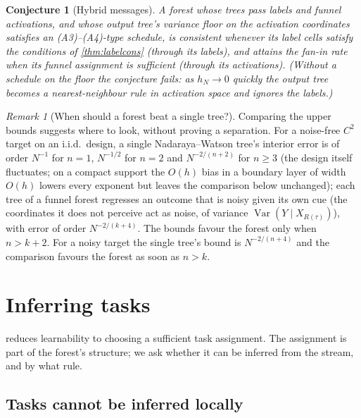 \documentclass[11pt]{article}
\newtheorem{conjecture}[theorem]{Conjecture}
\theoremstyle{definition}
\theoremstyle{remark}
\newtheorem{remark}[theorem]{Remark}
\newcommand{\Var}{\operatorname{Var}}
\begin{document}
\begin{conjecture}[Hybrid messages]\label{conj:hybrid}
A forest whose trees pass labels and funnel activations, and whose output tree's
variance floor on the activation coordinates satisfies an (A3)--(A4)-type schedule, is
consistent whenever its label cells satisfy the conditions of \cref{thm:labelcons}
(through its labels), and attains the fan-in rate when its funnel assignment is
sufficient (through its activations).  (Without a schedule on the floor the conjecture
fails: as $h_N\to0$ quickly the output tree becomes a nearest-neighbour rule in activation
space and ignores the labels.)
\end{conjecture}

\begin{remark}[When should a forest beat a single tree?]\label{rem:crossover}
Comparing the upper bounds suggests where to look, without proving a separation.  For a
noise-free $C^2$ target on an i.i.d.\ design, a single Nadaraya--Watson tree's interior
error is of order $N^{-1}$ for $n=1$, $N^{-1/2}$ for $n=2$ and $N^{-2/(n+2)}$ for $n\ge3$ (the
design itself fluctuates; on a compact support the $O(h)$ bias in a boundary layer of width
$O(h)$ lowers every exponent but leaves the comparison below unchanged); each tree of a funnel forest regresses an outcome that is noisy given
its own cue (the coordinates it does not perceive act as noise, of variance
$\Var(Y\mid X_{R(\tau)})$), with error of order $N^{-2/(k+4)}$.  The bounds favour the
forest only when $n>k+2$.  For a noisy target the single tree's bound is $N^{-2/(n+4)}$
and the comparison favours the forest as soon as $n>k$.
\end{remark}

\section{Inferring tasks}\label{sec:infer}

 reduces learnability to choosing a sufficient task assignment.  The
assignment is part of the forest's structure; we ask whether it can be inferred from the
stream, and by what rule.

\subsection{Tasks cannot be inferred locally}
\end{document}
